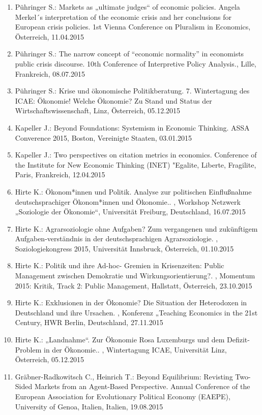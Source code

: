 \begin{enumerate}
	\item Pühringer S.: Markets as „ultimate judges“ of economic policies. Angela Merkel´s interpretation of the economic crisis and her conclusions for European crisis policies. 1st Vienna Conference on Pluralism in Economics, Österreich, 11.04.2015
	\item Pühringer S.: The narrow concept of “economic normality” in economists public crisis discourse. 10th Conference of Interpretive Policy Analysis., Lille, Frankreich, 08.07.2015
	\item Pühringer S.: Krise und ökonomische Politikberatung. 7. Wintertagung des ICAE: Ökonomie! Welche Ökonomie? Zu Stand und Status der Wirtschaftswissenschaft, Linz, Österreich, 05.12.2015
	\item Kapeller J.: Beyond Foundations: Systemism in Economic Thinking. ASSA Converence 2015, Boston, Vereinigte Staaten, 03.01.2015
	\item Kapeller J.: Two perspectives on citation metrics in economics. Conference of the Institute for New Economic Thinking (INET) "Egalite, Liberte, Fragilite, Paris, Frankreich, 12.04.2015
	\item Hirte K.: Ökonom*innen und Politik. Analyse zur politischen Einflußnahme deutschsprachiger Ökonom*innen und Ökonomie.. , Workshop Netzwerk „Soziologie der Ökonomie“, Universität Freiburg, Deutschland, 16.07.2015
	\item Hirte K.: Agrarsoziologie ohne Aufgaben?  Zum vergangenen und zukünftigem Aufgaben-verständnis in der deutschsprachigen Agrarsoziologie. , Soziologiekongress 2015, Universität Innsbruck, Österreich, 01.10.2015
	\item Hirte K.: Politik und ihre Ad-hoc- Gremien in Krisenzeiten: Public Management zwischen Demokratie und Wirkungsorientierung?. , Momentum 2015: Kritik, Track 2: Public Management, Hallstatt, Österreich, 23.10.2015
	\item Hirte K.: Exklusionen in der Ökonomie? Die Situation der Heterodoxen in Deutschland und ihre Ursachen. , Konferenz „Teaching Economics in the 21st Century, HWR Berlin, Deutschland, 27.11.2015
	\item Hirte K.: „Landnahme“. Zur Ökonomie Rosa Luxemburgs und dem Defizit-Problem in der Ökonomie.. , Wintertagung ICAE, Universität Linz, Österreich, 05.12.2015
	\item Gräbner-Radkowitsch C., Heinrich T.: Beyond Equilibrium: Revisting Two-Sided Markets from an Agent-Based Perspective. Annual Conference of the European Association for Evolutionary Political Economy (EAEPE), University of Genoa, Italien, Italien, 19.08.2015

\end{enumerate}

